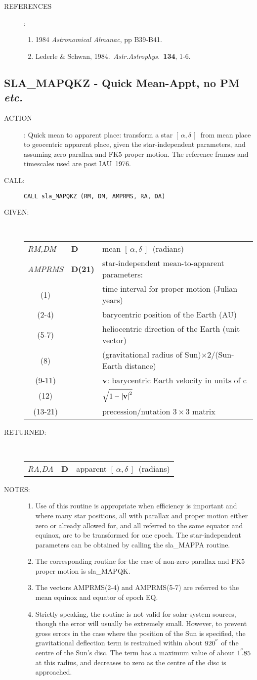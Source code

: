 \documentclass[11pt,twoside]{article}
\newcommand{\xlabel}[1]{}
\newcommand{\radec}     {$[\,\alpha,\delta\,]$}
\newcommand{\arcsec}[2] {\arcseci{#1}$\hspace{-0.4em}.#2$}
\newcommand{\arcsec}[2] {
      {$#1\hspace{-0.05em}^{'\hspace{-0.1em}'}\hspace{-0.4em}.#2$}
   }
\newcommand{\arcseci}[1] {$#1\hspace{-0.05em}$\raisebox{-0.5ex}
                         {$^{'\hspace{-0.1em}'}$}}
\renewcommand{\arcseci}[1] {$#1\hspace{-0.05em}^{'\hspace{-0.1em}'}$}
\newcommand{\routine}[3]
{\hbadness=10000
  \vbox
  {
    \rule{\textwidth}{0.3mm}\\
    {\Large {\bf #1} \hfill #2 \hfill {\bf #1}}\\
    \setlength{\oldspacing}{\topsep}
    \setlength{\topsep}{0.3ex}
    \begin{description}
      #3
    \end{description}
    \setlength{\topsep}{\oldspacing}
  }
}
\renewcommand{\routine}[3]
   {
      \subsection{#1\xlabel{#1} - #2\label{#1}}
       \begin{description}
         #3
       \end{description}
   }
\newcommand{\action}[1]
{\item[ACTION]: #1}
\newcommand{\action}[1]
   {\item[ACTION:] #1}
\newcommand{\call}[1]
{\item[CALL]: \hspace{0.4em}{\tt #1}}
\newlength{\oldspacing}
\renewcommand{\call}[1]
   {
    \item[CALL:] {\tt #1}
   }
\newcommand{\args}[2]
{
  \goodbreak
  \setlength{\oldspacing}{\topsep}
  \setlength{\topsep}{0.3ex}
  \begin{description}
  \item[#1]:\\[1.5ex]
    \begin{tabular}{p{7em}p{6em}p{22em}}
      #2
    \end{tabular}
  \end{description}
  \setlength{\topsep}{\oldspacing}
}
\renewcommand{\args}[2]
   {
     \begin{description}
        \item[#1:]\\
        \begin{tabular}{p{7em}p{6em}l}
           #2
        \end{tabular}
     \end{description}
   }
\newcommand{\spec}[3]
{
  {\em {#1}} & {\bf \mbox{#2}} & {#3}
}
\newcommand{\specel}[2]
{
  \multicolumn{1}{c}{#1} & {} & {#2}
}
\newcommand{\notes}[1]
{
  \goodbreak
  \setlength{\oldspacing}{\topsep}
  \setlength{\topsep}{0.3ex}
  \begin{description}
    \item[NOTES]:
        #1
  \end{description}
  \setlength{\topsep}{\oldspacing}
}
\renewcommand{\notes}[1]
   {
      \begin{description}
         \item[NOTES:]
            #1
      \end{description}
   }
\newcommand{\refs}[1]
{
  \goodbreak
  \setlength{\oldspacing}{\topsep}
  \setlength{\topsep}{0.3ex}
  \begin{description}
    \item[REFERENCES]:
        #1
  \end{description}
  \setlength{\topsep}{\oldspacing}
}
\newcommand{\refs}[1]
   {
     \begin{description}
       \item[REFERENCES:]
           #1
     \end{description}
   }
\begin{document}
\refs
{
 \begin{enumerate}
  \item 1984 {\it Astronomical Almanac}, pp B39-B41.
  \item Lederle \& Schwan, 1984.\ {\it Astr.Astrophys.}\ {\bf 134}, 1-6.
 \end{enumerate}
}
\routine{SLA\_MAPQKZ}{Quick Mean-Appt, no PM {\it etc.}}
{
 \action{Quick mean to apparent place:  transform a star \radec\ from
         mean place to geocentric apparent place, given the
         star-independent parameters, and assuming zero parallax
         and FK5 proper motion.
         The reference frames and timescales used are post IAU~1976.}
 \call{CALL sla\_MAPQKZ (RM, DM, AMPRMS, RA, DA)}
}
\args{GIVEN}
{
 \spec{RM,DM}{D}{mean \radec\ (radians)} \\
 \spec{AMPRMS}{D(21)}{star-independent mean-to-apparent parameters:} \\
 \specel   {(1)}     {time interval for proper motion (Julian years)} \\
 \specel   {(2-4)}   {barycentric position of the Earth (AU)} \\
 \specel   {(5-7)}   {heliocentric direction of the Earth (unit vector)} \\
 \specel   {(8)}     {(gravitational radius of
                      Sun)$\times 2 / $(Sun-Earth distance)} \\
 \specel   {(9-11)}  {{\bf v}: barycentric Earth velocity in units of c} \\
 \specel   {(12)}    {$\sqrt{1-\left|\mbox{\bf v}\right|^2}$} \\
 \specel   {(13-21)} {precession/nutation $3\times3$ matrix}
}
\args{RETURNED}
{
 \spec{RA,DA}{D}{apparent \radec\ (radians)}
}
\notes
{
 \begin{enumerate}
  \item Use of this routine is appropriate when efficiency is important
        and where many star positions, all with parallax and proper
        motion either zero or already allowed for, and all referred to
        the same equator and equinox, are to be transformed for one
        epoch.  The star-independent parameters can be obtained by
        calling the sla\_MAPPA routine.
  \item The corresponding routine for the case of non-zero parallax
        and FK5 proper motion is sla\_MAPQK.
  \item The vectors AMPRMS(2-4) and AMPRMS(5-7) are referred to the
        mean equinox and equator of epoch EQ.
  \item Strictly speaking, the routine is not valid for solar-system
        sources, though the error will usually be extremely small.
        However, to prevent gross errors in the case where the
        position of the Sun is specified, the gravitational
        deflection term is restrained within about \arcseci{920} of the
        centre of the Sun's disc.  The term has a maximum value of
        about \arcsec{1}{85} at this radius, and decreases to zero as
        the centre of the disc is approached.
 \end{enumerate}
}
\end{document}
